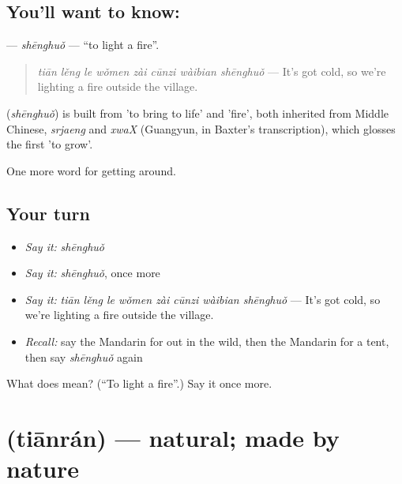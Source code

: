 \subsection*{You'll want to know: }
\textbf{} — \emph{shēnghuǒ} — \textquotedblleft{}to light a fire\textquotedblright{}.

\begin{quote}
\textbf{} \emph{tiān lěng le wǒmen zài cūnzi wàibian shēnghuǒ} — It's got cold, so we're lighting a fire outside the village.
\end{quote}

\begin{cousinweb}
\textbf{} (\emph{shēnghuǒ}) is built from  'to bring to life' and  'fire', both inherited from Middle Chinese, \emph{srjaeng} and \emph{xwaX} (Guangyun, in Baxter's transcription), which glosses the first 'to grow'.
\end{cousinweb}

\begin{grammarlens}[title={What you've built}]
One more word for getting around.
\end{grammarlens}

\subsection*{Your turn}
\begin{itemize}
\raggedright
  \item \emph{Say it:} \emph{shēnghuǒ}
  \item \emph{Say it:} \emph{shēnghuǒ}, once more
  \item \emph{Say it:} \emph{tiān lěng le wǒmen zài cūnzi wàibian shēnghuǒ} — It's got cold, so we're lighting a fire outside the village.
  \item \emph{Recall:} say the Mandarin for out in the wild, then the Mandarin for a tent, then say \emph{shēnghuǒ} again
\end{itemize}

\begin{tcolorbox}[breakable,colback=teal!4,colframe=teal!35!black,title={Before you move on}]
What does  mean? (\textquotedblleft{}To light a fire\textquotedblright{}.) Say it once more.
\end{tcolorbox}
\section[\texorpdfstring{\zh{天然} (tiānrán)}{天然 (tiānrán)}]{ (tiānrán) — natural; made by nature}

